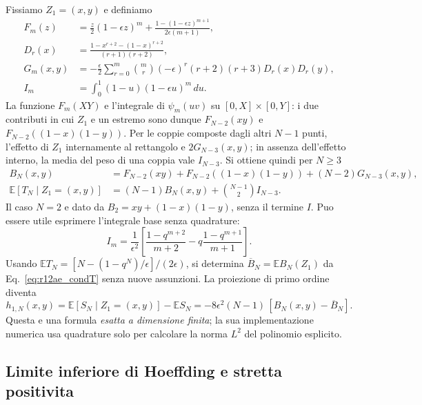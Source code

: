 \documentclass[11pt,a4paper]{article}
\begin{document}
Fissiamo $Z_1=(x,y)$ e definiamo
\begin{align}
 F_m(z)&=\frac z2(1-\epsilon z)^m+
 \frac{1-(1-\epsilon z)^{m+1}}{2\epsilon(m+1)},
 \label{eq:r12ae_F}\\
 D_r(x)&=\frac{1-x^{r+2}-(1-x)^{r+2}}{(r+1)(r+2)},
 \label{eq:r12ae_D}\\
 G_m(x,y)&=-\frac\epsilon2\sum_{r=0}^{m}
 \binom mr(-\epsilon)^r(r+2)(r+3)D_r(x)D_r(y),\\
 I_m&=\int_0^1(1-u)(1-\epsilon u)^m\,du.
 \label{eq:r12ae_GI}
\end{align}
La funzione $F_m(XY)$ e l'integrale di $\psi_m(uv)$ su $[0,X]\times[0,Y]$: i due contributi in cui $Z_1$ e un estremo sono dunque $F_{N-2}(xy)$ e $F_{N-2}((1-x)(1-y))$. Per le coppie composte dagli altri $N-1$ punti, l'effetto di $Z_1$ internamente al rettangolo e $2G_{N-3}(x,y)$; in assenza dell'effetto interno, la media del peso di una coppia vale $I_{N-3}$. Si ottiene quindi per $N\ge3$
\begin{align}
 B_N(x,y)&=F_{N-2}(xy)+F_{N-2}((1-x)(1-y))
 +(N-2)G_{N-3}(x,y),\\
 \mathbb E[T_N\mid Z_1=(x,y)]
 &=(N-1)B_N(x,y)+\binom{N-1}{2}I_{N-3}.
 \label{eq:r12ae_condT}
\end{align}
Il caso $N=2$ e dato da $B_2=xy+(1-x)(1-y)$, senza il termine $I$. Puo essere utile esprimere l'integrale base senza quadrature:
\begin{equation}
 I_m=\frac1{\epsilon^2}\left[
 \frac{1-q^{m+2}}{m+2}-q\frac{1-q^{m+1}}{m+1}\right].
 \label{eq:r12ae_Iclosed}
\end{equation}
Usando $\mathbb E T_N=[N-(1-q^N)/\epsilon]/(2\epsilon)$, si determina $\overline B_N=\mathbb EB_N(Z_1)$ da Eq.~\eqref{eq:r12ae_condT} senza nuove assunzioni. La proiezione di primo ordine diventa
\begin{equation}
 \boxed{h_{1,N}(x,y)=\mathbb E[S_N\mid Z_1=(x,y)]-\mathbb E S_N
 =-8\epsilon^2(N-1)\,[B_N(x,y)-\overline B_N].}
 \label{eq:r12ae_h1}
\end{equation}
Questa e una formula \emph{esatta a dimensione finita}; la sua implementazione numerica usa quadrature solo per calcolare la norma $L^2$ del polinomio esplicito.

\subsection{Limite inferiore di Hoeffding e stretta positivita}
\end{document}
